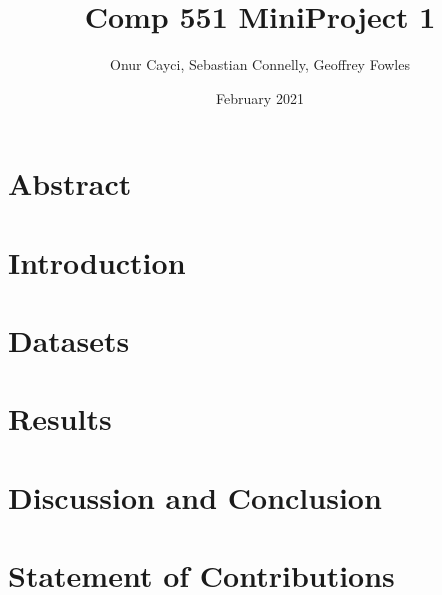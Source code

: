 \documentclass{article}
\title{Comp 551 MiniProject 1}
\author{Onur Cayci, Sebastian Connelly, Geoffrey Fowles }
\date{February 2021}
\begin{document}
\maketitle

\section{Abstract}

\section{Introduction}

\section{Datasets}

\section{Results}

\section{Discussion and Conclusion}

\section{Statement of Contributions}
\end{document}
